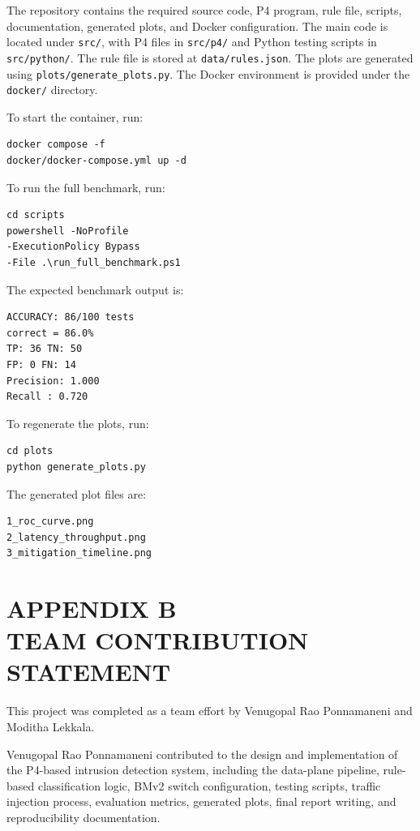 \documentclass[conference]{IEEEtran}
\begin{document}
The repository contains the required source code, P4
program, rule file, scripts, documentation, generated plots,
and Docker configuration. The main code is located under
\texttt{src/}, with P4 files in \texttt{src/p4/} and Python testing
scripts in \texttt{src/python/}. The rule file is stored at
\texttt{data/rules.json}. The plots are generated using
\texttt{plots/generate\_plots.py}. The Docker environment is
provided under the \texttt{docker/} directory.

\vspace{0.2cm}

To start the container, run:

\begin{verbatim}
docker compose -f
docker/docker-compose.yml up -d
\end{verbatim}

To run the full benchmark, run:

\begin{verbatim}
cd scripts
powershell -NoProfile
-ExecutionPolicy Bypass
-File .\run_full_benchmark.ps1
\end{verbatim}

The expected benchmark output is:

\begin{verbatim}
ACCURACY: 86/100 tests
correct = 86.0%
TP: 36 TN: 50
FP: 0 FN: 14
Precision: 1.000
Recall : 0.720
\end{verbatim}

To regenerate the plots, run:

\begin{verbatim}
cd plots
python generate_plots.py
\end{verbatim}

The generated plot files are:

\begin{verbatim}
1_roc_curve.png
2_latency_throughput.png
3_mitigation_timeline.png
\end{verbatim}

\clearpage

\section*{APPENDIX B\\TEAM CONTRIBUTION STATEMENT}

This project was completed as a team effort by Venugopal
Rao Ponnamaneni and Moditha Lekkala.

Venugopal Rao Ponnamaneni contributed to the design and
implementation of the P4-based intrusion detection system,
including the data-plane pipeline, rule-based classification
logic, BMv2 switch configuration, testing scripts, traffic
injection process, evaluation metrics, generated plots, final
report writing, and reproducibility documentation.
\end{document}
